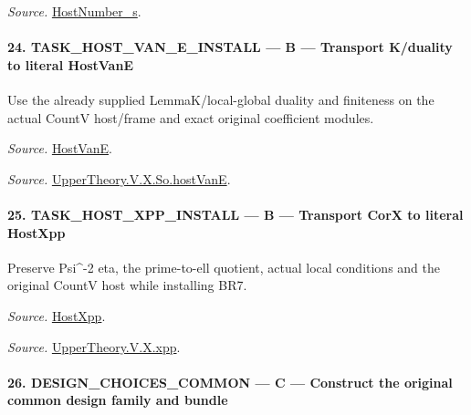\documentclass[11pt,a4paper]{article}
\numberwithin{equation}{section}
\theoremstyle{remark}\newtheorem{remark}[theorem]{Remark}
\begin{document}
\emph{Source.} \href{https://github.com/CocoSgt/riemann-hypothesis-lean/blob/7cbf7a0c32fca1badf05931879a37c3f8a2b03b4/src/Development/AutomorphicArithmetic/AutomorphicVarieties/ModularityArgument/ThresholdArguments/DenseThresholdCases/HostNumberS.lean#L18-L28}{HostNumber\_\allowbreak s}.



\paragraph{24. TASK\_\allowbreak HOST\_\allowbreak VAN\_\allowbreak E\_\allowbreak INSTALL — B — Transport K/duality to literal HostVanE}

Use the already supplied LemmaK/local-global duality and finiteness on the actual CountV host/frame and exact original coefficient modules.

\emph{Source.} \href{https://github.com/CocoSgt/riemann-hypothesis-lean/blob/7cbf7a0c32fca1badf05931879a37c3f8a2b03b4/src/Development/AutomorphicArithmetic/AutomorphicVarieties/UnitaryThreeDeformations/HostNumber.lean#L9-L12}{HostVanE}.

\emph{Source.} \href{https://github.com/CocoSgt/riemann-hypothesis-lean/blob/7cbf7a0c32fca1badf05931879a37c3f8a2b03b4/src/Development/AutomorphicArithmetic/AutomorphicVarieties/LevelCohomology/SoHostVanE.lean#L11-L18}{UpperTheory.V.X.So.hostVanE}.



\paragraph{25. TASK\_\allowbreak HOST\_\allowbreak XPP\_\allowbreak INSTALL — B — Transport CorX to literal HostXpp}

Preserve Psi\textasciicircum{}-2 eta, the prime-to-ell quotient, actual local conditions and the original CountV host while installing BR7.

\emph{Source.} \href{https://github.com/CocoSgt/riemann-hypothesis-lean/blob/7cbf7a0c32fca1badf05931879a37c3f8a2b03b4/src/Development/AutomorphicArithmetic/AutomorphicVarieties/UnitaryThreeDeformations/HostNumber.lean#L14-L17}{HostXpp}.

\emph{Source.} \href{https://github.com/CocoSgt/riemann-hypothesis-lean/blob/7cbf7a0c32fca1badf05931879a37c3f8a2b03b4/src/Development/AutomorphicArithmetic/AutomorphicVarieties/LevelCohomology/Xpp.lean#L11-L84}{UpperTheory.V.X.xpp}.



\paragraph{26. DESIGN\_\allowbreak CHOICES\_\allowbreak COMMON — C — Construct the original common design family and bundle}
\end{document}
